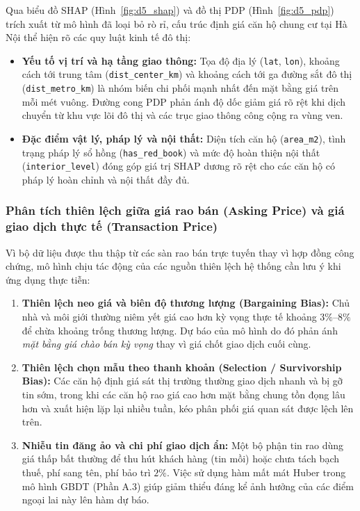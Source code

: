 Qua biểu đồ SHAP (Hình~\ref{fig:d5_shap}) và đồ thị PDP (Hình~\ref{fig:d5_pdp}) trích xuất từ mô hình đã loại bỏ rò rỉ, cấu trúc định giá căn hộ chung cư tại Hà Nội thể hiện rõ các quy luật kinh tế đô thị:
\begin{itemize}
    \item \textbf{Yếu tố vị trí và hạ tầng giao thông:} Tọa độ địa lý (\texttt{lat}, \texttt{lon}), khoảng cách tới trung tâm (\texttt{dist\_center\_km}) và khoảng cách tới ga đường sắt đô thị (\texttt{dist\_metro\_km}) là nhóm biến chi phối mạnh nhất đến mặt bằng giá trên mỗi mét vuông. Đường cong PDP phản ánh độ dốc giảm giá rõ rệt khi dịch chuyển từ khu vực lõi đô thị và các trục giao thông công cộng ra vùng ven.
    \item \textbf{Đặc điểm vật lý, pháp lý và nội thất:} Diện tích căn hộ (\texttt{area\_m2}), tình trạng pháp lý sổ hồng (\texttt{has\_red\_book}) và mức độ hoàn thiện nội thất (\texttt{interior\_level}) đóng góp giá trị SHAP dương rõ rệt cho các căn hộ có pháp lý hoàn chỉnh và nội thất đầy đủ.
\end{itemize}

\subsubsection{Phân tích thiên lệch giữa giá rao bán (Asking Price) và giá giao dịch thực tế (Transaction Price)}
Vì bộ dữ liệu được thu thập từ các sàn rao bán trực tuyến thay vì hợp đồng công chứng, mô hình chịu tác động của các nguồn thiên lệch hệ thống cần lưu ý khi ứng dụng thực tiễn:
\begin{enumerate}
    \item \textbf{Thiên lệch neo giá và biên độ thương lượng (Bargaining Bias):} Chủ nhà và môi giới thường niêm yết giá cao hơn kỳ vọng thực tế khoảng $3\%\text{--}8\%$ để chừa khoảng trống thương lượng. Dự báo của mô hình do đó phản ánh \textit{mặt bằng giá chào bán kỳ vọng} thay vì giá chốt giao dịch cuối cùng.
    \item \textbf{Thiên lệch chọn mẫu theo thanh khoản (Selection / Survivorship Bias):} Các căn hộ định giá sát thị trường thường giao dịch nhanh và bị gỡ tin sớm, trong khi các căn hộ rao giá cao hơn mặt bằng chung tồn đọng lâu hơn và xuất hiện lặp lại nhiều tuần, kéo phân phối giá quan sát được lệch lên trên.
    \item \textbf{Nhiễu tin đăng ảo và chi phí giao dịch ẩn:} Một bộ phận tin rao dùng giá thấp bất thường để thu hút khách hàng (tin mồi) hoặc chưa tách bạch thuế, phí sang tên, phí bảo trì $2\%$. Việc sử dụng hàm mất mát Huber trong mô hình GBDT (Phần A.3) giúp giảm thiểu đáng kể ảnh hưởng của các điểm ngoại lai này lên hàm dự báo.
\end{enumerate}